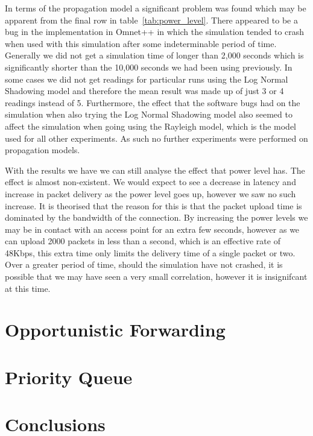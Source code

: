         In terms of the propagation model a significant problem was found which may be apparent from the final row in table~\ref{tab:power_level}. There appeared to be a bug in the implementation in Omnet++ in which the simulation tended to crash when used with this simulation after some indeterminable period of time. Generally we did not get a simulation time of longer than 2,000 seconds which is significantly shorter than the 10,000 seconds we had been using previously. In some cases we did not get readings for particular runs using the Log Normal Shadowing model and therefore the mean result was made up of just 3 or 4 readings instead of 5. Furthermore, the effect that the software bugs had on the simulation when also trying the Log Normal Shadowing model also seemed to affect the simulation when going using the Rayleigh model, which is the model used for all other experiments. As such no further experiments were performed on propagation models. 

        With the results we have we can still analyse the effect that power level has. The effect is almost non-existent. We would expect to see a decrease in latency and increase in packet delivery as the power level goes up, however we saw no such increase. It is theorised that the reason for this is that the packet upload time is dominated by the bandwidth of the connection. By increasing the power levels we may be in contact with an access point for an extra few seconds, however as we can upload 2000 packets in less than a second, which is an effective rate of 48Kbps, this extra time only limits the delivery time of a single packet or two. Over a greater period of time, should the simulation have not crashed, it is possible that we may have seen a very small correlation, however it is insignifcant at this time. 





    \section{Opportunistic Forwarding}\label{data_gathering_performance_opportunistic_forwarding}


    \section{Priority Queue}\label{data_gathering_performance_priority_queue}


    \section{Conclusions}\label{data_gathering_performance_conclusions}

